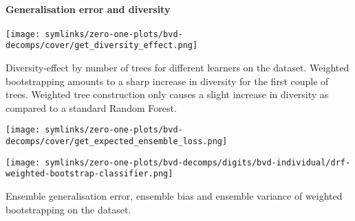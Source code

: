 \documentclass[../main.tex]{subfiles}
\begin{document}
\paragraph{Generalisation error and diversity} 

\begin{marginfigure}
    \texttt{[image: symlinks/zero-one-plots/bvd-decomps/cover/get\_diversity\_effect.png]}
    \caption{
        Diversity-effect by number of trees for different learners on the \cover dataset. Weighted bootstrapping amounts to a sharp increase in diversity for the first couple of trees. Weighted tree construction only causes a slight increase in diversity as compared to a standard Random Forest.
    }
    \label{fig:cover-diversity-effect}
\end{marginfigure}

\begin{marginfigure}
    \texttt{[image: symlinks/zero-one-plots/bvd-decomps/cover/get\_expected\_ensemble\_loss.png]}
    \caption{
        Expected generalisation error for different learners on the \cover dataset. Weighted tree construction and standard Random Forests behave almost identically. For weighted bootstrapping, an initial increase in error is followed by a consistently lower error rate.
    }
    \label{fig:cover-ensemble-loss}
\end{marginfigure}




\begin{marginfigure}
    \texttt{[image: symlinks/zero-one-plots/bvd-decomps/digits/bvd-individual/drf-weighted-bootstrap-classifier.png]}
    \caption{
        Ensemble generalisation error, ensemble bias and ensemble variance of weighted bootstrapping on the \digits dataset. 
    }
    \label{fig:digits-bvd}
\end{marginfigure}
\end{document}
